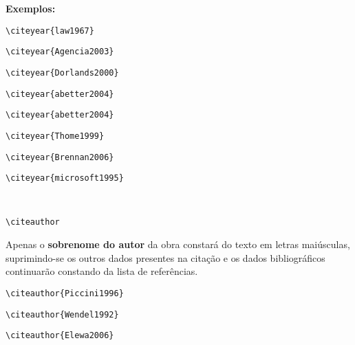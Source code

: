 \begin{alineas}
\textbf{Exemplos:}

\begin{verbatim}
\citeyear{law1967}
\end{verbatim}
\citeyear{law1967}

\begin{verbatim}
\citeyear{Agencia2003}
\end{verbatim}
\citeyear{Agencia2003}

\begin{verbatim}
\citeyear{Dorlands2000}
\end{verbatim}
\citeyear{Dorlands2000}

\begin{verbatim}
\citeyear{abetter2004}
\end{verbatim}
\citeyear{abetter2004}

\begin{verbatim}
\citeyear{abetter2004}
\end{verbatim}
\citeyear{council2001}

\begin{verbatim}
\citeyear{Thome1999}
\end{verbatim}
\citeyear{Thome1999}


\begin{verbatim}
\citeyear{Brennan2006}
\end{verbatim}
\citeyear{Brennan2006}

\begin{verbatim}
\citeyear{microsoft1995}
\end{verbatim}
\citeyear{microsoft1995}\\

\item
\begin{verbatim}
\citeauthor
\end{verbatim}

Apenas o \textbf{sobrenome do autor} da obra constará do texto em letras maiúsculas, suprimindo-se os outros dados presentes na citação e os dados bibliográficos continuarão constando da lista de referências.  

{\tiny {\tiny }}\begin{verbatim}
\citeauthor{Piccini1996} 
\end{verbatim}
\citeauthor{Piccini1996} 

\begin{verbatim}
\citeauthor{Wendel1992}
\end{verbatim}
\citeauthor{Wendel1992}

\begin{verbatim}
\citeauthor{Elewa2006}
\end{verbatim}
\citeauthor{Elewa2006}


\end{alineas}
